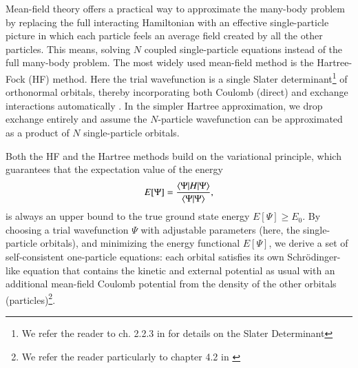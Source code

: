\documentclass{subfiles}
\begin{document}
Mean-field theory offers a practical way to approximate the many-body problem by replacing the full interacting Hamiltonian with an effective single-particle picture in which each particle feels an average field created by all the other particles. This means, solving $N$ coupled single-particle equations instead of the full many-body problem. The most widely used mean-field method is the Hartree-Fock (HF) method. Here the trial wavefunction is a single Slater determinant\footnote{We refer the reader to ch. 2.2.3 in \cite{szabo1996modern} for details on the Slater Determinant} of orthonormal orbitals, thereby incorporating both Coulomb (direct) and exchange interactions automatically \cite{szabo1996modern, helgaker2013molecular}. In the simpler Hartree approximation, we drop exchange entirely and assume the $N$-particle wavefunction can be approximated as a product of $N$ single-particle orbitals.

Both the HF and the Hartree methods build on the variational principle, which guarantees that the expectation value of the energy
\begin{equation}
    E[\Psi] = \frac{\braket{\Psi|H|\Psi}}{\braket{\Psi|\Psi}}\label{eq:variational_principle},
\end{equation}
is always an upper bound to the true ground state energy $E[\Psi]\geq E_0$. By choosing a trial wavefunction $\Psi$ with adjustable parameters (here, the single-particle orbitals), and minimizing the energy functional $E[\Psi]$, we derive a set of self-consistent one-particle equations: each orbital satisfies its own Schrödinger-like equation that contains the kinetic and external potential as usual with an additional mean-field Coulomb potential from the density of the other orbitals (particles)\cite{helgaker2013molecular}\footnote{We refer the reader particularly to chapter 4.2 in \cite{helgaker2013molecular}}.
\end{document}
